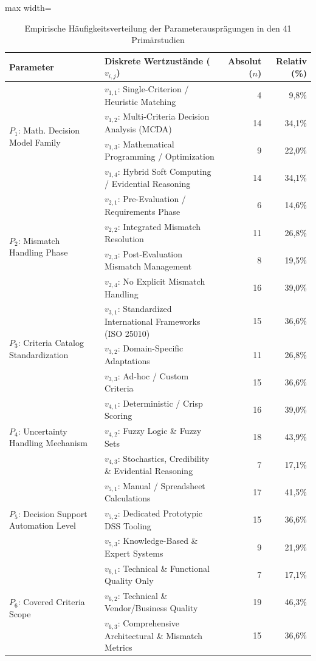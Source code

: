 \begin{table}[htbp]
\centering
\caption{Empirische Häufigkeitsverteilung der Parameterausprägungen in den 41 Primärstudien}
\label{tab:morphological_frequencies}
\begin{adjustbox}{max width=\textwidth}
\begin{tabular}{llrr}
\toprule
\textbf{Parameter} & \textbf{Diskrete Wertzustände ($v_{i,j}$)} & \textbf{Absolut ($n$)} & \textbf{Relativ (\%)} \\
\midrule
\multirow{4}{*}{$P_1$: Math. Decision Model Family} 
 & $v_{1,1}$: Single-Criterion / Heuristic Matching & 4 & 9,8\% \\
 & $v_{1,2}$: Multi-Criteria Decision Analysis (MCDA) & 14 & 34,1\% \\
 & $v_{1,3}$: Mathematical Programming / Optimization & 9 & 22,0\% \\
 & $v_{1,4}$: Hybrid Soft Computing / Evidential Reasoning & 14 & 34,1\% \\
\midrule
\multirow{4}{*}{$P_2$: Mismatch Handling Phase} 
 & $v_{2,1}$: Pre-Evaluation / Requirements Phase & 6 & 14,6\% \\
 & $v_{2,2}$: Integrated Mismatch Resolution & 11 & 26,8\% \\
 & $v_{2,3}$: Post-Evaluation Mismatch Management & 8 & 19,5\% \\
 & $v_{2,4}$: No Explicit Mismatch Handling & 16 & 39,0\% \\
\midrule
\multirow{3}{*}{$P_3$: Criteria Catalog Standardization} 
 & $v_{3,1}$: Standardized International Frameworks (ISO 25010) & 15 & 36,6\% \\
 & $v_{3,2}$: Domain-Specific Adaptations & 11 & 26,8\% \\
 & $v_{3,3}$: Ad-hoc / Custom Criteria & 15 & 36,6\% \\
\midrule
\multirow{3}{*}{$P_4$: Uncertainty Handling Mechanism} 
 & $v_{4,1}$: Deterministic / Crisp Scoring & 16 & 39,0\% \\
 & $v_{4,2}$: Fuzzy Logic \& Fuzzy Sets & 18 & 43,9\% \\
 & $v_{4,3}$: Stochastics, Credibility \& Evidential Reasoning & 7 & 17,1\% \\
\midrule
\multirow{3}{*}{$P_5$: Decision Support Automation Level} 
 & $v_{5,1}$: Manual / Spreadsheet Calculations & 17 & 41,5\% \\
 & $v_{5,2}$: Dedicated Prototypic DSS Tooling & 15 & 36,6\% \\
 & $v_{5,3}$: Knowledge-Based \& Expert Systems & 9 & 21,9\% \\
\midrule
\multirow{3}{*}{$P_6$: Covered Criteria Scope} 
 & $v_{6,1}$: Technical \& Functional Quality Only & 7 & 17,1\% \\
 & $v_{6,2}$: Technical \& Vendor/Business Quality & 19 & 46,3\% \\
 & $v_{6,3}$: Comprehensive Architectural \& Mismatch Metrics & 15 & 36,6\% \\
\bottomrule
\end{tabular}
\end{adjustbox}
\end{table}

